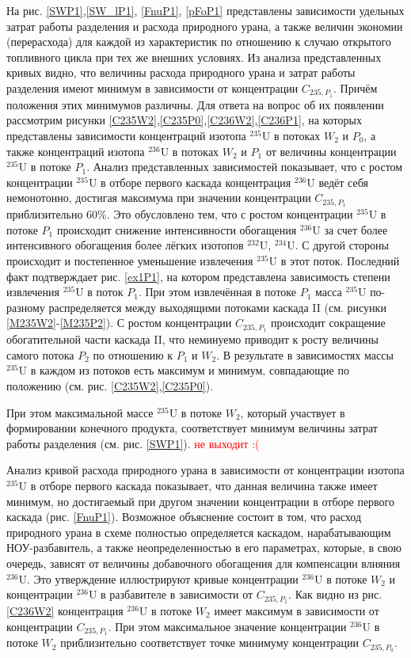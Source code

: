 На рис. \ref{SWP1},\ref{SW_lP1}, \ref{FnuP1}, \ref{pFoP1} представлены зависимости удельных затрат работы разделения и расхода природного урана, а также величин экономии (перерасхода) для каждой из характеристик по отношению к случаю открытого топливного цикла при тех же внешних условиях. Из анализа представленных кривых видно, что величины расхода природного урана и затрат работы разделения имеют минимум в зависимости от концентрации $C_{235,{P_1}}$. Причём положения этих минимумов различны. Для ответа на вопрос об их появлении рассмотрим рисунки \ref{C235W2},\ref{C235P0},\ref{C236W2},\ref{C236P1}, на которых представлены зависимости концентраций изотопа $^{235}$U в потоках $W_2$ и $P_0$, а также концентраций изотопа $^{236}$U в потоках $W_2$ и $P_1$ от величины концентрации $^{235}$U в потоке $P_1$. Анализ представленных зависимостей показывает, что с ростом концентрации $^{235}$U в отборе первого каскада концентрация $^{236}$U ведёт себя немонотонно, достигая максимума при значении концентрации $C_{235,{P_1}}$ приблизительно 60\%. Это обусловлено тем, что с ростом концентрации $^{235}$U в потоке $P_1$ происходит снижение интенсивности обогащения $^{236}$U за счет более интенсивного обогащения более лёгких изотопов $^{232}$U, $^{234}$U. С другой стороны происходит и постепенное уменьшение извлечения $^{235}$U в этот поток. Последний факт подтверждает рис. \ref{ex1P1}, на котором представлена зависимость степени извлечения $^{235}$U в поток $P_1$. При этом извлечённая в потоке $P_1$ масса $^{235}$U по-разному распределяется между выходящими потоками каскада II (см. рисунки \ref{M235W2}-\ref{M235P2}). С ростом концентрации $C_{235,{P_1}}$ происходит сокращение обогатительной части каскада II, что неминуемо приводит к росту величины самого потока $P_2$ по отношению к $P_1$ и $W_2$. В результате  в зависимостях массы $^{235}$U в каждом из потоков есть максимум и минимум, совпадающие по положению (см. рис. \ref{C235W2},\ref{C235P0}).

При этом максимальной массе $^{235}$U в потоке $W_2$, который участвует в формировании конечного продукта, соответствует минимум величины затрат работы разделения (см. рис. \ref{SWP1}). \textcolor{red}{не выходит :(}


Анализ кривой расхода природного урана в зависимости от концентрации изотопа $^{235}$U в отборе первого каскада показывает, что данная величина также имеет минимум, но достигаемый при другом значении концентрации в отборе первого каскада (рис. \ref{FnuP1}). Возможное объяснение состоит в том, что расход природного урана в схеме полностью определяется каскадом, нарабатывающим НОУ-разбавитель, а также неопределенностью в его параметрах, которые, в свою очередь, зависят от величины добавочного обогащения для компенсации влияния $^{236}$U. Это утверждение иллюстрируют кривые концентрации $^{236}$U в потоке $W_2$ и концентрации $^{236}$U в разбавителе в зависимости от $C_{235,{P_1}}$. Как видно из рис. \ref{C236W2} концентрация $^{236}$U в потоке $W_2$ имеет максимум в зависимости от концентрации $C_{235,{P_1}}$. При этом максимальное значение концентрации $^{236}$U в потоке $W_2$ приблизительно соответствует точке минимуму концентрации $C_{235,{P_0}}$. 

